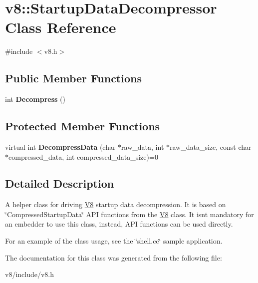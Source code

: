 \hypertarget{classv8_1_1StartupDataDecompressor}{}\section{v8\+:\+:Startup\+Data\+Decompressor Class Reference}
\label{classv8_1_1StartupDataDecompressor}


{\ttfamily \#include $<$v8.\+h$>$}

\subsection*{Public Member Functions}
\begin{DoxyCompactItemize}
\item 
\hypertarget{classv8_1_1StartupDataDecompressor_aa970485a491f415500bfb0632e472ab7}{}int {\bfseries Decompress} ()\label{classv8_1_1StartupDataDecompressor_aa970485a491f415500bfb0632e472ab7}

\end{DoxyCompactItemize}
\subsection*{Protected Member Functions}
\begin{DoxyCompactItemize}
\item 
\hypertarget{classv8_1_1StartupDataDecompressor_a503b3e37337dfc60729e773ca60827b9}{}virtual int {\bfseries Decompress\+Data} (char $\ast$raw\+\_\+data, int $\ast$raw\+\_\+data\+\_\+size, const char $\ast$compressed\+\_\+data, int compressed\+\_\+data\+\_\+size)=0\label{classv8_1_1StartupDataDecompressor_a503b3e37337dfc60729e773ca60827b9}

\end{DoxyCompactItemize}


\subsection{Detailed Description}
A helper class for driving \hyperlink{classv8_1_1V8}{V8} startup data decompression. It is based on \char`\"{}\+Compressed\+Startup\+Data\char`\"{} A\+P\+I functions from the \hyperlink{classv8_1_1V8}{V8} class. It isn\textquotesingle{}t mandatory for an embedder to use this class, instead, A\+P\+I functions can be used directly.

For an example of the class usage, see the \char`\"{}shell.\+cc\char`\"{} sample application. 

The documentation for this class was generated from the following file\+:\begin{DoxyCompactItemize}
\item 
v8/include/v8.\+h\end{DoxyCompactItemize}
